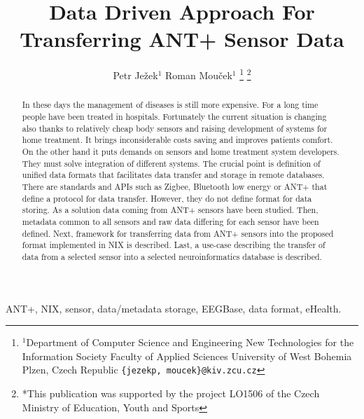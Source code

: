 \documentclass[conference]{IEEEtran}
\begin{document}
  \title{Data Driven Approach For Transferring ANT+ Sensor Data}

  \author{{Petr Je\v{z}ek$^{1}$ Roman Mou\v{c}ek$^{1}$}
\thanks{$^{1}$Department of Computer Science and Engineering
New Technologies for the Information Society
Faculty of Applied Sciences
University of West Bohemia
Plzen, Czech Republic
        {\tt\small \{jezekp, moucek\}@kiv.zcu.cz}}%
\thanks{*This publication was supported by the project LO1506 of the Czech Ministry of Education, Youth and Sports}%
}
\maketitle



\begin{abstract}
In these days the management of diseases is still more expensive. For a long time people have been treated in hospitals. Fortunately the current situation is changing also thanks to relatively cheap body sensors and raising development of systems for home treatment. It brings inconsiderable costs saving and improves patients comfort. On the other hand it puts demands on sensors and home treatment system developers. They must solve integration of different systems. The crucial point is definition of unified data formats that facilitates data transfer and storage in remote databases. There are standards and APIs such as Zigbee, Bluetooth low energy or ANT+ that define a protocol for data transfer. However, they do not define format for data storing. As a solution data coming from ANT+ sensors have been studied. Then, metadata common to all sensors and raw data differing for each sensor have been defined. Next, framework for transferring data from ANT+ sensors into the proposed format implemented in NIX is described. Last, a use-case describing the transfer of data from a selected sensor into a selected neuroinformatics database is described.



\end{abstract}

\begin{IEEEkeywords}
ANT+, NIX, sensor, data/metadata storage, EEGBase, data format, eHealth.
\end{IEEEkeywords}
\end{document}
